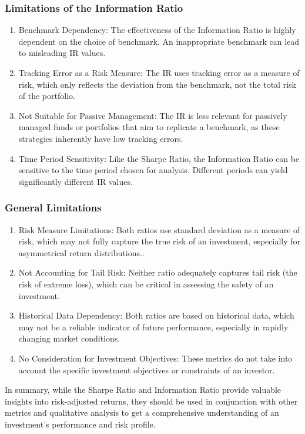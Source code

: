 \documentclass{article}
\begin{document}
\subsubsection{Limitations of the Information Ratio}
\begin{enumerate}
    \item Benchmark Dependency: The effectiveness of the Information Ratio is highly dependent on the choice of benchmark. An inappropriate benchmark can lead to misleading IR values.
    \item Tracking Error as a Risk Measure: The IR uses tracking error as a measure of risk, which only reflects the deviation from the benchmark, not the total risk of the portfolio.
    \item Not Suitable for Passive Management: The IR is less relevant for passively managed funds or portfolios that aim to replicate a benchmark, as these strategies inherently have low tracking errors.
    \item Time Period Sensitivity: Like the Sharpe Ratio, the Information Ratio can be sensitive to the time period chosen for analysis. Different periods can yield significantly different IR values.
\end{enumerate}

\subsubsection{General Limitations}
\begin{enumerate}
    \item Risk Measure Limitations: Both ratios use standard deviation as a measure of risk, which may not fully capture the true risk of an investment, especially for asymmetrical return distributions..
    \item Not Accounting for Tail Risk: Neither ratio adequately captures tail risk (the risk of extreme loss), which can be critical in assessing the safety of an investment.
    \item Historical Data Dependency: Both ratios are based on historical data, which may not be a reliable indicator of future performance, especially in rapidly changing market conditions.
    \item No Consideration for Investment Objectives: These metrics do not take into account the specific investment objectives or constraints of an investor.
\end{enumerate}

In summary, while the Sharpe Ratio and Information Ratio provide valuable insights into risk-adjusted returns, they should be used in conjunction with other metrics and qualitative analysis to get a comprehensive understanding of an investment's performance and risk profile.
\end{document}

